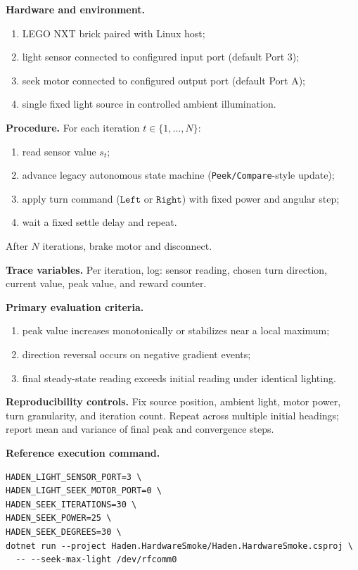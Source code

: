 \textbf{Hardware and environment.}
\begin{enumerate}
\item LEGO NXT brick paired with Linux host;
\item light sensor connected to configured input port (default Port 3);
\item seek motor connected to configured output port (default Port A);
\item single fixed light source in controlled ambient illumination.
\end{enumerate}

\textbf{Procedure.}
For each iteration $t \in \{1,\dots,N\}$:
\begin{enumerate}
\item read sensor value $s_t$;
\item advance legacy autonomous state machine (\texttt{Peek/Compare}-style update);
\item apply turn command ($\texttt{Left}$ or $\texttt{Right}$) with fixed power and angular step;
\item wait a fixed settle delay and repeat.
\end{enumerate}
After $N$ iterations, brake motor and disconnect.

\textbf{Trace variables.}
Per iteration, log: sensor reading, chosen turn direction, current value, peak value, and reward counter.

\textbf{Primary evaluation criteria.}
\begin{enumerate}
\item peak value increases monotonically or stabilizes near a local maximum;
\item direction reversal occurs on negative gradient events;
\item final steady-state reading exceeds initial reading under identical lighting.
\end{enumerate}

\textbf{Reproducibility controls.}
Fix source position, ambient light, motor power, turn granularity, and iteration count.
Repeat across multiple initial headings; report mean and variance of final peak and convergence steps.

\textbf{Reference execution command.}
\begin{verbatim}
HADEN_LIGHT_SENSOR_PORT=3 \
HADEN_LIGHT_SEEK_MOTOR_PORT=0 \
HADEN_SEEK_ITERATIONS=30 \
HADEN_SEEK_POWER=25 \
HADEN_SEEK_DEGREES=30 \
dotnet run --project Haden.HardwareSmoke/Haden.HardwareSmoke.csproj \
  -- --seek-max-light /dev/rfcomm0
\end{verbatim}
